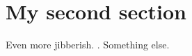 \documentclass[fontsize=12pt,DIV=8,letterpaper,oneside]{scrartcl}
\begin{document}
\section{My second section}

Even more jibberish. \citet{CharnessDufwenberg2006}. Something else.

\ifstandalone
\printbibliography
\fi
\end{document}
